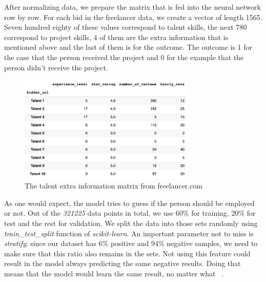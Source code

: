 After normalizing data, we prepare the matrix that is fed into the neural network row by row. For each bid in the freelancer data, we create a vector of length 1565. Seven hundred eighty of these values correspond to talent skills, the next 780 correspond to project skills, 4 of them are the extra information that is mentioned above and the last of them is for the outcome. The outcome is 1 for the case that the person received the project and 0 for the example that the person didn't receive the project.



\begin{figure}[htp]
	\centering
	\includegraphics[width=0.75\textwidth]{figures/FreelancerTalentMeta.png}
	\caption{The talent extra information matrix from freelancer.com}
	\label{fig:freelancer-talent-meta}
\end{figure}

As one would expect, the model tries to guess if the person should be employed or not. Out of the \textit{321225} data points in total, we use 60\% for training, 20\% for test and the rest for validation. We split the data into those sets randomly using \textit{train\_test\_split} function of \textit{scikit-learn}. An important parameter not to miss is \textit{stratify}; since our dataset has  6\% positive and 94\% negative samples, we need to make sure that this ratio also remains in the sets. Not using this feature could result in the model always predicting the same negative results. Doing that means that the model would learn the same result, no matter what ~\parencite{singh2015survey}.

